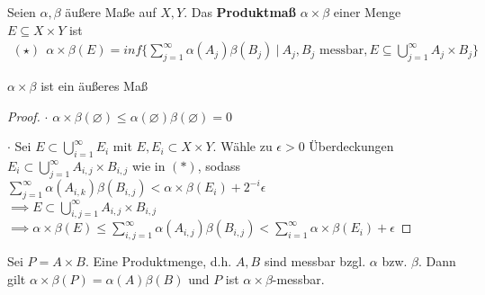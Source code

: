   \begin{definition}
    Seien $\alpha, \beta$ äußere Maße auf $X,Y$. Das \textbf{Produktmaß} $\alpha \times \beta$ einer Menge $E \subseteq X \times Y$ ist
    \begin{align*}
      (\star) \ \ \alpha \times \beta (E) = inf\{\sum\limits_{j=1}^{\infty} \alpha(A_j) \beta(B_j) \ | \ A_j, B_j \text{ messbar}, E \subseteq \bigcup\limits_{j=1}^{\infty} A_j \times B_j\}
    \end{align*}
  \end{definition}

  \begin{lemma}
    $\alpha \times \beta$ ist ein äußeres Maß
  \end{lemma}
  \begin{proof}
    \item[$\cdot$] $\alpha \times \beta (\varnothing) \leq \alpha (\varnothing) \beta (\varnothing) = 0$ 
	\item[$\cdot$] Sei $E\subset \bigcup\limits_{i=1}^\infty E_i$ mit $E, E_i \subset X\times Y$. Wähle zu $\epsilon >0$ Überdeckungen $E_i \subset \bigcup\limits_{j=1}^\infty A_{i,j}\times B_{i,j}$ wie in $(\ast)$, sodass $\sum\limits_{j=1}^\infty \alpha (A_{i,k}) \beta(B_{i,j}) < \alpha \times \beta (E_i) + 2^{-i} \epsilon$ \\
	$\implies E\subset \bigcup\limits_{i,j=1}^\infty A_{i,j}\times B_{i,j}$\\
	$\implies \alpha \times \beta (E) \leq \sum\limits_{i,j=1}^\infty \alpha(A_{i,j})\beta(B_{i,j}) < \sum\limits_{i=1}^\infty \alpha \times \beta (E_i)+\epsilon$
  \end{proof}

  \begin{lemma}
    Sei $P = A \times B$. Eine Produktmenge, d.h. $A,B$ sind messbar bzgl. $\alpha$ bzw. $\beta$. Dann gilt $\alpha \times \beta(P) = \alpha(A) \beta(B)$ und $P$ ist $\alpha \times \beta$-messbar.
  \end{lemma}

